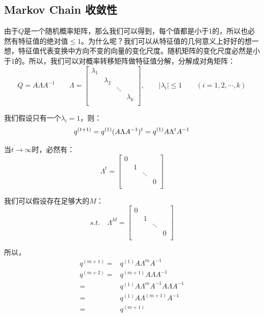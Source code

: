 \documentclass[a4paper]{article}
\begin{document}
\subsection{Markov Chain 收敛性}
由于$Q$是一个随机概率矩阵，那么我们可以得到，每个值都是小于1的，所以也必然有特征值的绝对值$\leq 1$。为什么呢？我们可以从特征值的几何意义上好好的想一想，特征值代表变换中方向不变的向量的变化尺度。随机矩阵的变化尺度必然是小于1的。所以，我们可以对概率转移矩阵做特征值分解，分解成对角矩阵：
\begin{equation}
    Q = A\Lambda A^{-1} \qquad \Lambda = 
    \begin{bmatrix}
     \lambda_1 & & & \\
     & \lambda_2 & & \\
     & & \ddots & \\
     & & & \lambda_k \\
    \end{bmatrix}
    ,\qquad |\lambda_i| \leq 1
    \qquad (i = 1, 2, \cdots, k)
\end{equation}

我们假设只有一个$\lambda_i= 1$，则：
\begin{equation}
    q^{(t+1)} = q^{(1)}(A\Lambda A^{-1})^t = q^{(1)}A\Lambda^t A^{-1} \\ 
\end{equation}

当$t\rightarrow \infty$时，必然有：
\begin{equation}
    \Lambda^t = 
    \begin{bmatrix}
     0 & & & \\
     & 1 & & \\
     & & \ddots & \\
     & & & 0 \\
    \end{bmatrix}
\end{equation}

我们可以假设存在足够大的$M$：
\begin{equation}
    s.t.\quad \Lambda^M = 
    \begin{bmatrix}
     0 & & & \\
     & 1 & & \\
     & & \ddots & \\
     & & & 0 \\
    \end{bmatrix}
\end{equation}

所以，
\begin{equation}
    \begin{split}
        q^{(m+1)} = & q^{(1)} A\Lambda^mA^{-1} \\
        q^{(m+2)} 
        = & q^{(m+1)} A\Lambda A^{-1} \\
        = & q^{(1)} A\Lambda^mA^{-1} A\Lambda A^{-1} \\
        = & q^{(1)} A\Lambda^{(m+1)}A^{-1} \\
        = & q^{(m+1)}
    \end{split}
\end{equation}
\end{document}
